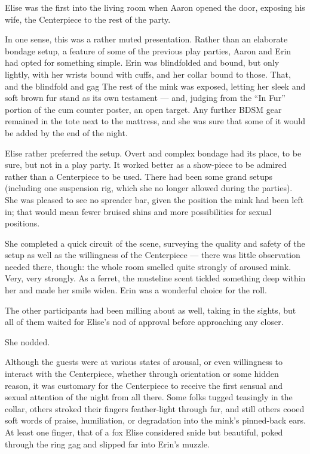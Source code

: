 Elise was the first into the living room when Aaron opened the door, exposing his wife, the Centerpiece to the rest of the party.

In one sense, this was a rather muted presentation. Rather than an elaborate bondage setup, a feature of some of the previous play parties, Aaron and Erin had opted for something simple. Erin was blindfolded and bound, but only lightly, with her wrists bound with cuffs, and her collar bound to those. That, and the blindfold and gag The rest of the mink was exposed, letting her sleek and soft brown fur stand as its own testament --- and, judging from the ``In Fur'' portion of the cum counter poster, an open target. Any further BDSM gear remained in the tote next to the mattress, and she was sure that some of it would be added by the end of the night.

Elise rather preferred the setup. Overt and complex bondage had its place, to be sure, but not in a play party. It worked better as a show-piece to be admired rather than a Centerpiece to be used. There had been some grand setups (including one suspension rig, which she no longer allowed during the parties). She was pleased to see no spreader bar, given the position the mink had been left in; that would mean fewer bruised shins and more possibilities for sexual positions.

She completed a quick circuit of the scene, surveying the quality and safety of the setup as well as the willingness of the Centerpiece --- there was little observation needed there, though: the whole room smelled quite strongly of aroused mink. Very, very strongly. As a ferret, the musteline scent tickled something deep within her and made her smile widen. Erin was a wonderful choice for the roll.

The other participants had been milling about as well, taking in the sights, but all of them waited for Elise's nod of approval before approaching any closer.

She nodded.

Although the guests were at various states of arousal, or even willingness to interact with the Centerpiece, whether through orientation or some hidden reason, it was customary for the Centerpiece to receive the first sensual and sexual attention of the night from all there. Some folks tugged teasingly in the collar, others stroked their fingers feather-light through fur, and still others cooed soft words of praise, humiliation, or degradation into the mink's pinned-back ears. At least one finger, that of a fox Elise considered snide but beautiful, poked through the ring gag and slipped far into Erin's muzzle.

